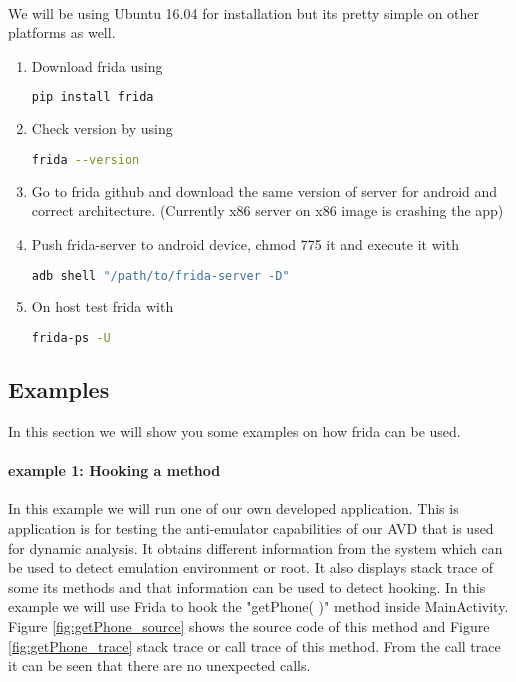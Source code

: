 \documentclass[../main.tex]{subfile}
\begin{document}
	\paragraph{} We will be using Ubuntu 16.04 for installation but its pretty simple on other platforms as well.
	\begin{enumerate}
		\item Download frida using
			\begin{lstlisting}[language=bash, numbers=none]
				pip install frida
			\end{lstlisting}
		
		\item Check version by using
			\begin{lstlisting}[language=bash, numbers=none]
				frida --version
			\end{lstlisting}
		\item Go to frida github and download the same version of server for android and correct architecture. (Currently x86 server on x86 image
		is crashing the app)
		\item Push frida-server to android device, chmod 775 it and execute it with
			\begin{lstlisting}[language=bash, numbers=none]
				adb shell "/path/to/frida-server -D"
			\end{lstlisting}
		\item On host test frida with
			\begin{lstlisting}[language=bash, numbers=none]
				frida-ps -U
			\end{lstlisting}
	\end{enumerate}

	\subsection{Examples}
	In this section we will show you some examples on how frida can be used.

	\paragraph{example 1: Hooking a method} \label{sec::hooking} In this example we will run one of our own developed application. This is application is for testing the anti-emulator capabilities of our AVD that is used for dynamic analysis. It obtains different information from the system which can be used to detect emulation environment or root. It also displays stack trace of some its methods and that information can be used to detect hooking. In this example we will use Frida to hook the "getPhone( )" method inside MainActivity. Figure \ref{fig:getPhone_source} shows the source code of this method and Figure \ref{fig:getPhone_trace} stack trace or call trace of this method. From the call trace it can be seen that there are no unexpected calls.
	
\end{document}
